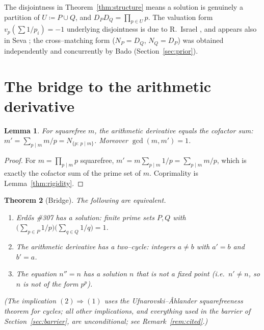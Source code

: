 \documentclass[11pt]{article}
\newtheorem{theorem}{Theorem}[section]
\newtheorem{lemma}[theorem]{Lemma}
\theoremstyle{definition}
\begin{document}
The disjointness in Theorem~\ref{thm:structure} means a solution is genuinely a partition of
$U\coloneqq P\cup Q$, and $D_PD_Q=\prod_{p\in U}p$. The valuation form $v_p(\sum 1/p_i)=-1$ underlying
disjointness is due to R.~Israel \cite{MO320838}, and appears also in Seva \cite{Seva323194}; the
cross--matching form ($N_P=D_Q$, $N_Q=D_P$) was obtained independently and concurrently by Bado
\cite[Thm.~A]{Bado2026} (Section~\ref{sec:prior}).

\section{The bridge to the arithmetic derivative}\label{sec:bridge}

\begin{lemma}\label{lem:der-cofactor}
For squarefree $m$, the arithmetic derivative equals the cofactor sum: $m'=\sum_{p\mid m}m/p=N_{\{p:\,p\mid m\}}$. Moreover $\gcd(m,m')=1$.
\end{lemma}

\begin{proof}
For $m=\prod_{p\mid m}p$ squarefree, $m'=m\sum_{p\mid m}1/p=\sum_{p\mid m}m/p$, which is exactly the
cofactor sum of the prime set of $m$. Coprimality is Lemma~\ref{thm:rigidity}.
\end{proof}

\begin{theorem}[Bridge]\label{thm:bridge}
The following are equivalent.
\begin{enumerate}[label=\textup{(\arabic*)},leftmargin=2.2em]
\item Erd\H{o}s \#307 has a solution: finite prime sets $P,Q$ with
$\bigl(\sum_{p\in P}1/p\bigr)\bigl(\sum_{q\in Q}1/q\bigr)=1$.
\item The arithmetic derivative has a two--cycle: integers $a\ne b$ with $a'=b$ and $b'=a$.
\item The equation $n''=n$ has a solution $n$ that is not a fixed point (i.e.\ $n'\ne n$, so $n$ is
not of the form $p^{p}$).
\end{enumerate}
\textup{(}The implication $(2)\Rightarrow(1)$ uses the Ufnarovski--\AA hlander squarefreeness
theorem for cycles; all other implications, and everything used in the barrier of
Section~\textup{\ref{sec:barrier}}, are unconditional; see Remark~\textup{\ref{rem:cited}}.\textup{)}
\end{theorem}
\end{document}
